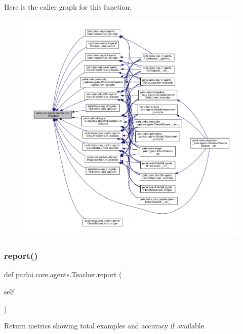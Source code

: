 Here is the caller graph for this function\+:
\nopagebreak
\begin{figure}[H]
\begin{center}
\leavevmode
\includegraphics[width=350pt]{classparlai_1_1core_1_1agents_1_1Teacher_a93370e4e99236e8ad267b40cd4437920_icgraph}
\end{center}
\end{figure}
\mbox{\label{classparlai_1_1core_1_1agents_1_1Teacher_aa0afab11fb5f3f26ac59576f064623a4}} 
\subsubsection{\texorpdfstring{report()}{report()}}
{\footnotesize\ttfamily def parlai.\+core.\+agents.\+Teacher.\+report (\begin{DoxyParamCaption}\item[{}]{self }\end{DoxyParamCaption})}

\begin{DoxyVerb}Return metrics showing total examples and accuracy if available.\end{DoxyVerb}
 

